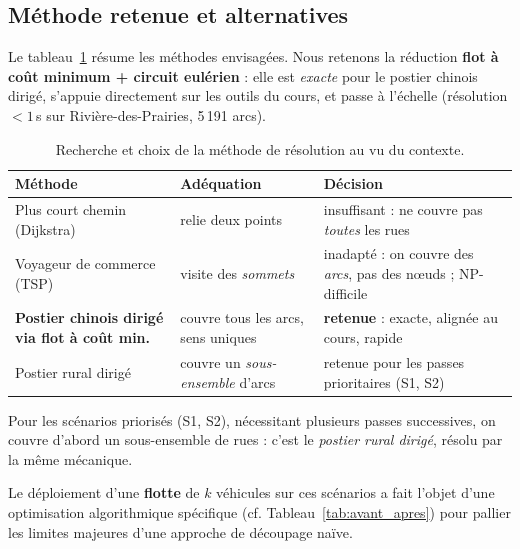 \documentclass[11pt,a4paper]{article}
\begin{document}
\subsection{Méthode retenue et alternatives}
Le tableau~\ref{tab:methodes} résume les méthodes envisagées. Nous retenons la
réduction \textbf{flot à coût minimum + circuit eulérien} : elle est
\emph{exacte} pour le postier chinois dirigé, s'appuie directement sur les
outils du cours, et passe à l'échelle (résolution $<1$\,s sur
Rivière-des-Prairies, 5\,191 arcs).

\begin{table}[H]
\centering\small
\begin{tabular}{p{4.4cm}p{4.0cm}p{6.2cm}}
\toprule
Méthode & Adéquation & Décision\\
\midrule
Plus court chemin (Dijkstra) & relie deux points & insuffisant : ne couvre pas \emph{toutes} les rues\\
Voyageur de commerce (TSP) & visite des \emph{sommets} & inadapté : on couvre des \emph{arcs}, pas des nœuds ; NP-difficile\\
\textbf{Postier chinois dirigé via flot à coût min.} & couvre tous les arcs, sens uniques & \textbf{retenue} : exacte, alignée au cours, rapide\\
Postier rural dirigé & couvre un \emph{sous-ensemble} d'arcs & retenue pour les passes prioritaires (S1, S2)\\
\bottomrule
\end{tabular}
\caption{Recherche et choix de la méthode de résolution au vu du contexte.}
\label{tab:methodes}
\end{table}

Pour les scénarios priorisés (S1, S2), nécessitant plusieurs passes successives, on couvre d'abord un sous-ensemble de rues : c'est le \emph{postier rural dirigé}, résolu par la même mécanique. 

Le déploiement d'une \textbf{flotte} de $k$ véhicules sur ces scénarios a fait l'objet d'une optimisation algorithmique spécifique (cf. Tableau~\ref{tab:avant_apres}) pour pallier les limites majeures d'une approche de découpage naïve.
\end{document}
